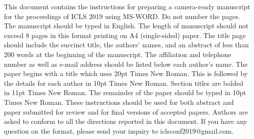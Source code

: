 \documentclass{article}
\title{     }
\author{     }
\date{     }
\begin{document}
 
This document contains the instructions for preparing a camera-ready manuscript for the proceedings of ICLS 2019 using MS-WORD. Do not number the pages. The manuscript should be typed in English. The length of manuscript should not exceed 8 pages in this format printing on A4 (single-sided) paper. The title page should include the succinct title, the authors’ names, and an abstract of less than 200 words at the beginning of the manuscript. The affiliation and telephone number as well as e-mail address should be listed below each author’s name. The paper begins with a title which uses 20pt Times New Roman. This is followed by the details for each author in 10pt Times New Roman. Section titles are bolded in 11pt Times New Roman. The remainder of the paper should be typed in 10pt Times New Roman. These instructions should be used for both abstract and paper submitted for review and for final versions of accepted papers. Authors are asked to conform to all the directions reported in this document. If you have any question on the format, please send your inquiry to iclsconf2019@gmail.com. 
\end{document}
